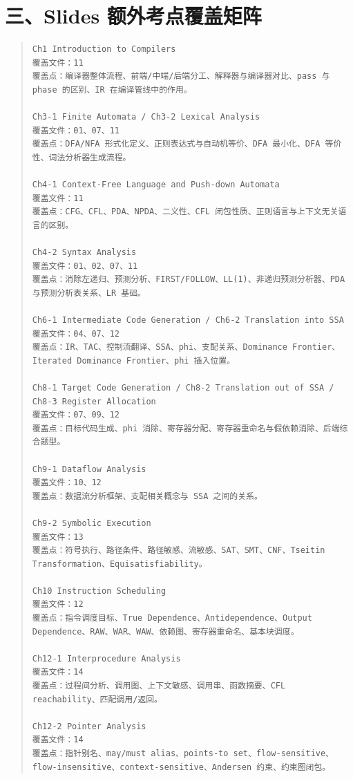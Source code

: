 \documentclass[UTF8,zihao=-4]{ctexart}
\begin{document}
\section*{三、Slides 额外考点覆盖矩阵}


\begin{quote}
\footnotesize
\begin{verbatim}
Ch1 Introduction to Compilers
覆盖文件：11
覆盖点：编译器整体流程、前端/中端/后端分工、解释器与编译器对比、pass 与 phase 的区别、IR 在编译管线中的作用。

Ch3-1 Finite Automata / Ch3-2 Lexical Analysis
覆盖文件：01、07、11
覆盖点：DFA/NFA 形式化定义、正则表达式与自动机等价、DFA 最小化、DFA 等价性、词法分析器生成流程。

Ch4-1 Context-Free Language and Push-down Automata
覆盖文件：11
覆盖点：CFG、CFL、PDA、NPDA、二义性、CFL 闭包性质、正则语言与上下文无关语言的区别。

Ch4-2 Syntax Analysis
覆盖文件：01、02、07、11
覆盖点：消除左递归、预测分析、FIRST/FOLLOW、LL(1)、非递归预测分析器、PDA 与预测分析表关系、LR 基础。

Ch6-1 Intermediate Code Generation / Ch6-2 Translation into SSA
覆盖文件：04、07、12
覆盖点：IR、TAC、控制流翻译、SSA、phi、支配关系、Dominance Frontier、Iterated Dominance Frontier、phi 插入位置。

Ch8-1 Target Code Generation / Ch8-2 Translation out of SSA / Ch8-3 Register Allocation
覆盖文件：07、09、12
覆盖点：目标代码生成、phi 消除、寄存器分配、寄存器重命名与假依赖消除、后端综合题型。

Ch9-1 Dataflow Analysis
覆盖文件：10、12
覆盖点：数据流分析框架、支配相关概念与 SSA 之间的关系。

Ch9-2 Symbolic Execution
覆盖文件：13
覆盖点：符号执行、路径条件、路径敏感、流敏感、SAT、SMT、CNF、Tseitin Transformation、Equisatisfiability。

Ch10 Instruction Scheduling
覆盖文件：12
覆盖点：指令调度目标、True Dependence、Antidependence、Output Dependence、RAW、WAR、WAW、依赖图、寄存器重命名、基本块调度。

Ch12-1 Interprocedure Analysis
覆盖文件：14
覆盖点：过程间分析、调用图、上下文敏感、调用串、函数摘要、CFL reachability、匹配调用/返回。

Ch12-2 Pointer Analysis
覆盖文件：14
覆盖点：指针别名、may/must alias、points-to set、flow-sensitive、flow-insensitive、context-sensitive、Andersen 约束、约束图闭包。
\end{verbatim}
\end{quote}
\end{document}
